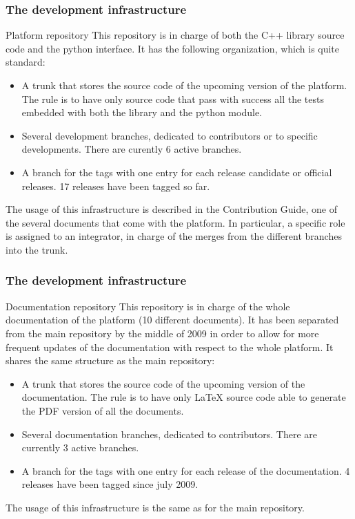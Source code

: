 \documentclass[8pt]{beamer}
\begin{document}
\begin{frame}
  \frametitle{The development infrastructure}
  \begin{block}{Platform repository}
    This repository is in charge of both the C++ library source code and the python interface. It has the following organization, which is quite standard:
    \begin{itemize}
    \item A trunk that stores the source code of the upcoming version of the platform. The rule is to have only source code that pass with success all the tests embedded with both the library and the python module.
    \item Several development branches, dedicated to contributors or to specific developments. There are curently 6 active branches.
    \item A branch for the tags with one entry for each release candidate or official releases. 17 releases have been tagged so far.
    \end{itemize}
    The usage of this infrastructure is described in the Contribution Guide, one of the several documents that come with the platform. In particular, a specific role is assigned to an \alert{integrator}, in charge of the merges from the different branches into the trunk.
  \end{block}
\end{frame}
\begin{frame}
  \frametitle{The development infrastructure}
  \begin{block}{Documentation repository}
    This repository is in charge of the whole documentation of the platform (10 different documents). It has been separated from the main repository by the middle of 2009 in order to allow for more frequent updates of the documentation with respect to the whole platform. It shares the same structure as the main repository:
    \begin{itemize}
    \item A trunk that stores the source code of the upcoming version of the documentation. The rule is to have only LaTeX source code able to generate the PDF version of all the documents.
    \item Several documentation branches, dedicated to contributors. There are currently 3 active branches.
    \item A branch for the tags with one entry for each release of the documentation. 4 releases have been tagged since july 2009.
    \end{itemize}
    The usage of this infrastructure is the same as for the main repository.
  \end{block}
\end{frame}
\end{document}
